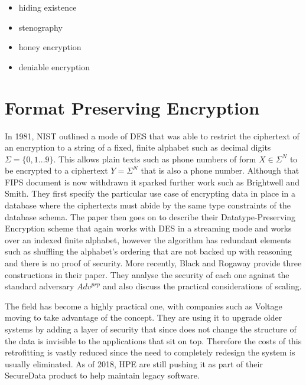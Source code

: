 \documentclass[10pt,a4paper]{article}
\begin{document}
\begin{itemize}
 \item hiding existence
 \item stenography
 \item honey encryption
 \item deniable encryption
\end{itemize}

\pagebreak
\section{Format Preserving Encryption}

In 1981, NIST\cite{FIPS74} outlined a mode of DES that was able to restrict the ciphertext of an encryption to a string of a fixed, finite alphabet such as decimal digits $ \Sigma = \{0,1...9\} $. This allows plain texts such as phone numbers of form $ X \in \Sigma^N $ to be encrypted to a ciphertext $ Y = \Sigma^N $ that is also a phone number. Although that FIPS document is now withdrawn it sparked further work such as Brightwell and Smith\cite{DPE}. They first specify the particular use case of encrypting data in place in a database where the ciphertexts must abide by the same type constraints of the database schema. The paper then goes on to describe their  Datatype-Preserving Encryption scheme that again works with DES in a streaming mode and works over an indexed finite alphabet, however the algorithm has redundant elements such as shuffling the alphabet's ordering that are not backed up with reasoning and there is no proof of security. More recently, Black and Rogaway\cite{CAFD} provide three constructions in their paper. They analyse the security of each one against the standard adversary $Adv^{prp}$ and also discuss the practical considerations of scaling.

The field has become a highly practical one, with companies such as Voltage moving to take advantage of the concept. They are using it to upgrade older systems by adding a layer of security that since does not change the structure of the data is invisible to the applications that sit on top. Therefore the costs of this retrofitting is vastly reduced since the need to completely redesign the system is usually eliminated. As of 2018, HPE\cite{hp} are still pushing it as part of their SecureData product to help maintain legacy software.
\end{document}
